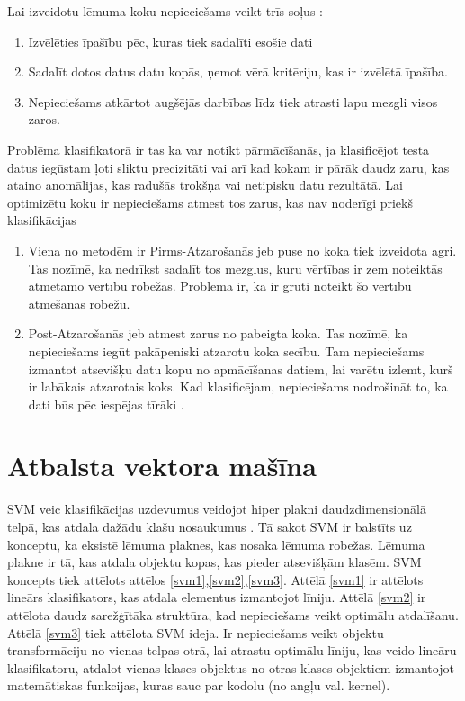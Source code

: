 \documentclass[12pt,paper=A4]{report}
\begin{document}
 
Lai izveidotu lēmuma koku nepieciešams veikt trīs soļus \cite{dtw14}:
\begin{enumerate}

\item	Izvēlēties īpašību pēc, kuras tiek sadalīti esošie dati

\item	Sadalīt dotos datus datu kopās, ņemot vērā kritēriju, kas ir izvēlētā īpašība.

\item	Nepieciešams atkārtot augšējās darbības līdz tiek atrasti lapu mezgli visos zaros. 

\end{enumerate}
Problēma klasifikatorā ir tas ka var notikt pārmācīšanās, ja klasificējot testa datus iegūstam ļoti sliktu precizitāti vai arī kad kokam ir pārāk daudz zaru, kas ataino anomālijas, kas radušās trokšņa vai netipisku datu rezultātā.
Lai optimizētu koku ir nepieciešams atmest tos zarus, kas nav noderīgi priekš klasifikācijas 

\begin{enumerate}

\item	Viena no metodēm ir Pirms-Atzarošanās jeb puse no koka tiek izveidota agri. Tas nozīmē, ka nedrīkst sadalīt tos mezglus, kuru vērtības ir zem noteiktās atmetamo vērtību robežas. Problēma ir, ka ir grūti noteikt šo vērtību atmešanas robežu.

\item	Post-Atzarošanās jeb atmest zarus no pabeigta koka. Tas nozīmē, ka nepieciešams iegūt pakāpeniski atzarotu koka secību. Tam nepieciešams izmantot atsevišķu datu kopu no apmācīšanas datiem, lai varētu izlemt, kurš ir labākais atzarotais koks. 
Kad klasificējam, nepieciešams nodrošināt to, ka dati būs pēc iespējas tīrāki \cite{dtw14}. 

\end{enumerate}


\section{Atbalsta vektora mašīna}

SVM veic klasifikācijas uzdevumus veidojot hiper plakni daudzdimensionālā telpā, kas atdala dažādu klašu nosaukumus \cite{http://users.ecs.soton.ac.uk/srg/publications/pdf/SVM.pdf}. Tā sakot SVM ir balstīts uz konceptu, ka eksistē lēmuma plaknes, kas nosaka lēmuma robežas. Lēmuma plakne ir tā, kas atdala objektu kopas, kas pieder atsevišķām klasēm. SVM koncepts tiek attēlots attēlos \ref{svm1},\ref{svm2},\ref{svm3}. Attēlā \ref{svm1} ir attēlots lineārs klasifikators, kas atdala elementus izmantojot līniju. Attēlā \ref{svm2} ir attēlota daudz sarežģītāka struktūra, kad nepieciešams veikt optimālu atdalīšanu. Attēlā \ref{svm3} tiek attēlota SVM ideja. Ir nepieciešams veikt objektu transformāciju no vienas telpas otrā, lai atrastu optimālu līniju, kas veido lineāru klasifikatoru, atdalot vienas klases objektus no otras klases objektiem izmantojot matemātiskas funkcijas, kuras sauc par kodolu (no angļu val. kernel). 
\end{document}
